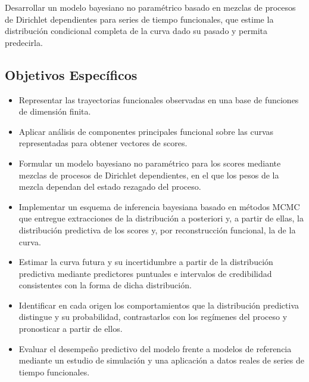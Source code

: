 Desarrollar un modelo bayesiano no paramétrico basado en mezclas de procesos de Dirichlet dependientes para series de tiempo funcionales, que estime la distribución condicional completa de la curva dado su pasado y permita predecirla.

\subsection{Objetivos Específicos}
\label{01_03_01_objetivos_especificos}

\begin{itemize}
    \item Representar las trayectorias funcionales observadas en una base de funciones de dimensión finita.

    \item Aplicar análisis de componentes principales funcional sobre las curvas representadas para obtener vectores de scores.

    \item Formular un modelo bayesiano no paramétrico para los scores mediante mezclas de procesos de Dirichlet dependientes, en el que los pesos de la mezcla dependan del estado rezagado del proceso.

    \item Implementar un esquema de inferencia bayesiana basado en métodos MCMC que entregue extracciones de la distribución a posteriori y, a partir de ellas, la distribución predictiva de los scores y, por reconstrucción funcional, la de la curva.

    \item Estimar la curva futura y su incertidumbre a partir de la distribución predictiva mediante predictores puntuales e intervalos de credibilidad consistentes con la forma de dicha distribución.

    \item Identificar en cada origen los comportamientos que la distribución predictiva distingue y su probabilidad, contrastarlos con los regímenes del proceso y pronosticar a partir de ellos.

    \item Evaluar el desempeño predictivo del modelo frente a modelos de referencia mediante un estudio de simulación y una aplicación a datos reales de series de tiempo funcionales.
\end{itemize}